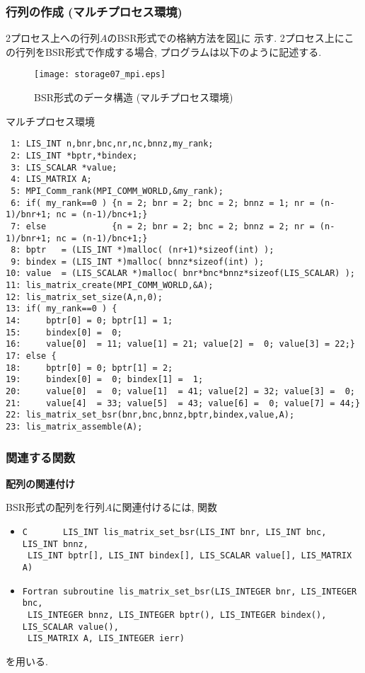 \documentclass[a4paper]{jarticle}
\begin{document}
{{\subsubsection{行列の作成 (マルチプロセス環境)}
2プロセス上への行列$A$のBSR形式での格納方法を図\ref{fig:storage07_mpi}に
示す. 
2プロセス上にこの行列をBSR形式で作成する場合, プログラムは以下のように記述する. 
\begin{figure}[h]
{\centering 
\texttt{[image: storage07\_mpi.eps]} 
\caption{BSR形式のデータ構造 (マルチプロセス環境)}\label{fig:storage07_mpi}}
\end{figure}
\begin{itembox}[l]{マルチプロセス環境}
\small
\begin{verbatim}
 1: LIS_INT n,bnr,bnc,nr,nc,bnnz,my_rank;
 2: LIS_INT *bptr,*bindex;
 3: LIS_SCALAR *value;
 4: LIS_MATRIX A;
 5: MPI_Comm_rank(MPI_COMM_WORLD,&my_rank);
 6: if( my_rank==0 ) {n = 2; bnr = 2; bnc = 2; bnnz = 1; nr = (n-1)/bnr+1; nc = (n-1)/bnc+1;}
 7: else             {n = 2; bnr = 2; bnc = 2; bnnz = 2; nr = (n-1)/bnr+1; nc = (n-1)/bnc+1;}
 8: bptr   = (LIS_INT *)malloc( (nr+1)*sizeof(int) );
 9: bindex = (LIS_INT *)malloc( bnnz*sizeof(int) );
10: value  = (LIS_SCALAR *)malloc( bnr*bnc*bnnz*sizeof(LIS_SCALAR) );
11: lis_matrix_create(MPI_COMM_WORLD,&A);
12: lis_matrix_set_size(A,n,0);
13: if( my_rank==0 ) {
14:     bptr[0] = 0; bptr[1] = 1;
15:     bindex[0] =  0;
16:     value[0]  = 11; value[1] = 21; value[2] =  0; value[3] = 22;}
17: else {
18:     bptr[0] = 0; bptr[1] = 2;
19:     bindex[0] =  0; bindex[1] =  1;
20:     value[0]  =  0; value[1]  = 41; value[2] = 32; value[3] =  0;
21:     value[4]  = 33; value[5]  = 43; value[6] =  0; value[7] = 44;}
22: lis_matrix_set_bsr(bnr,bnc,bnnz,bptr,bindex,value,A);
23: lis_matrix_assemble(A);
\end{verbatim}
\end{itembox}

\subsubsection{関連する関数}
\noindent
{\bf 配列の関連付け}

BSR形式の配列を行列$A$に関連付けるには, 関数
\begin{itemize}
\item \verb|C       LIS_INT lis_matrix_set_bsr(LIS_INT bnr, LIS_INT bnc, LIS_INT bnnz,|\\
      \verb| LIS_INT bptr[], LIS_INT bindex[], LIS_SCALAR value[], LIS_MATRIX A)|
\item \verb|Fortran subroutine lis_matrix_set_bsr(LIS_INTEGER bnr, LIS_INTEGER bnc,|\\
      \verb| LIS_INTEGER bnnz, LIS_INTEGER bptr(), LIS_INTEGER bindex(), LIS_SCALAR value(),|\\
      \verb| LIS_MATRIX A, LIS_INTEGER ierr)|
\end{itemize}
を用いる. 

}}
\end{document}
